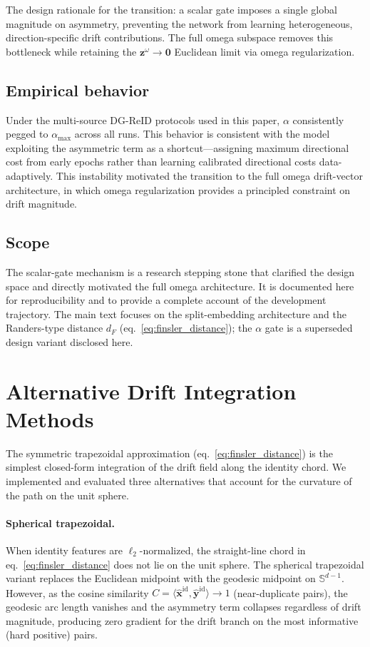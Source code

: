 The design rationale for the transition: a scalar gate imposes a single global magnitude on asymmetry, preventing the network from learning heterogeneous, direction-specific drift contributions. The full omega subspace removes this bottleneck while retaining the $\mathbf{z}^{\omega}\to\mathbf{0}$ Euclidean limit via omega regularization.

\subsection{Empirical behavior}
Under the multi-source DG-ReID protocols used in this paper, $\alpha$ consistently pegged to $\alpha_{\max}$ across all runs. This behavior is consistent with the model exploiting the asymmetric term as a shortcut—assigning maximum directional cost from early epochs rather than learning calibrated directional costs data-adaptively. This instability motivated the transition to the full omega drift-vector architecture, in which omega regularization provides a principled constraint on drift magnitude.

\subsection{Scope}
The scalar-gate mechanism is a research stepping stone that clarified the design space and directly motivated the full omega architecture. It is documented here for reproducibility and to provide a complete account of the development trajectory. The main text focuses on the split-embedding architecture and the Randers-type distance $d_F$ (eq.~\ref{eq:finsler_distance}); the $\alpha$ gate is a superseded design variant disclosed here.

\section{Alternative Drift Integration Methods} \label{sec:suppl_drift_integration}
The symmetric trapezoidal approximation (eq.~\ref{eq:finsler_distance}) is the simplest closed-form integration of the drift field along the identity chord. We implemented and evaluated three alternatives that account for the curvature of the path on the unit sphere.

\paragraph{Spherical trapezoidal.}
When identity features are $\ell_2$-normalized, the straight-line chord in eq.~\eqref{eq:finsler_distance} does not lie on the unit sphere. The spherical trapezoidal variant replaces the Euclidean midpoint with the geodesic midpoint on $\mathbb{S}^{d-1}$. However, as the cosine similarity $C = \langle \hat{\mathbf{x}}^{\mathrm{id}}, \hat{\mathbf{y}}^{\mathrm{id}} \rangle \to 1$ (near-duplicate pairs), the geodesic arc length vanishes and the asymmetry term collapses regardless of drift magnitude, producing zero gradient for the drift branch on the most informative (hard positive) pairs.

